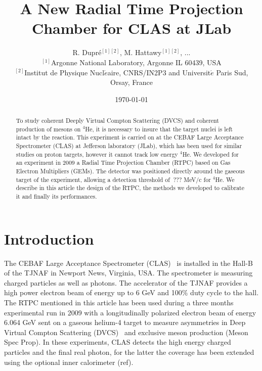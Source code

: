 \documentclass[reprint, amsmath,amssymb, aps]{revtex4}
\begin{document}

\title{\vspace{-15mm}\fontsize{24pt}{10pt}\selectfont\textbf{A New Radial Time Projection Chamber for CLAS at JLab}}
\author{
\Large{R. Dupr\'e$^{[1][2]}$, M. Hattawy$^{[1][2]}$, ...} \\
\vspace{+5mm}
\normalsize $^{[1]}$Argonne National Laboratory, Argonne IL 60439, USA \\
\normalsize $^{[2]}$Institut de Physique Nucl$\acute{e}$aire, CNRS/IN2P3 and Universit$\acute{e}$ Paris Sud, Orsay, France \\
}



\date{\today}%

\vspace{+25mm}
\begin{abstract}
To study coherent Deeply Virtual Compton Scattering (DVCS) and coherent production of mesons on $^4$He, it is necessary to insure that the target nuclei is left intact by the reaction. This experiment is carried on at the CEBAF Large Acceptance Spectrometer (CLAS) at Jefferson laboratory (JLab), which has been used for similar studies on proton targets, however it cannot track low energy $^4$He. We developed for an experiment in 2009 a Radial Time Projection Chamber (RTPC) based on Gas Electron Multipliers (GEMs). The detector was positioned directly around the gaseous target of the experiment, allowing a detection threshold of $~$??? MeV/c for $^4$He. We describe in this article the design of the RTPC, the methods we developed to calibrate it and finally its performances.
\end{abstract}

\maketitle


\section{\label{sec:level1} Introduction}

The CEBAF Large Acceptance Spectrometer (CLAS)~\cite{CLASref} is installed in the Hall-B of the TJNAF in Newport News, Virginia, USA. The spectrometer is measuring charged particles as well as photons. The accelerator of the TJNAF provides a high power electron beam of energy up to 6 GeV and 100$\%$ duty cycle to the hall. The RTPC mentioned in this article has been used during a three months experimental run in 2009 with a longitudinally polarized electron beam of energy 6.064 GeV sent on a gaseous helium-4 target to measure asymmetries in Deep Virtual Compton Scattering (DVCS)~\cite{proposal} and exclusive meson production (Meson Spec Prop). In these experiments, CLAS detects the high energy charged particles and the final real photon, for the latter the coverage has been extended using the optional inner calorimeter (ref). 
\end{document}
